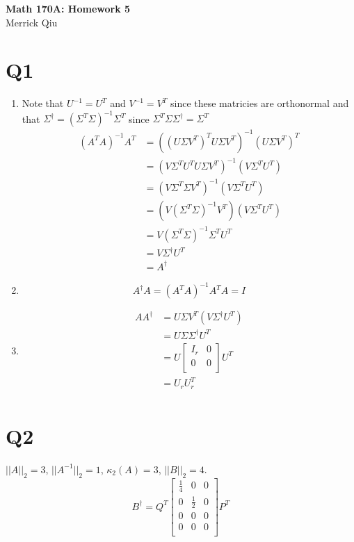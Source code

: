 \documentclass{article}
\newcommand{\inv}[1]{#1^{-1}}
\begin{document}
\begin{center}
	\huge{\bf Math 170A: Homework 5} \\
	Merrick Qiu
\end{center}

\section*{Q1}
\begin{enumerate}
    \item Note that $\inv{U} = U^T$ and $\inv{V} = V^T$
    since these matricies are orthonormal and that 
    $\Sigma^\dagger = \inv{(\Sigma^T \Sigma)}\Sigma^T$
    since $\Sigma^T \Sigma \Sigma^\dagger = \Sigma^T$
    \begin{align*}
        \inv{(A^TA)}A^T &= \inv{((U\Sigma V^T)^TU\Sigma V^T)} (U\Sigma V^T)^T \\
        &= \inv{(V\Sigma^T U^T  U\Sigma V^T)}(V\Sigma^T U^T) \\
        &= \inv{(V\Sigma^T \Sigma V^T)}(V\Sigma^T U^T) \\
        &= (V\inv{(\Sigma^T \Sigma)} V^T)(V\Sigma^T U^T) \\
        &= V\inv{(\Sigma^T \Sigma)}\Sigma^T U^T \\
        &= V \Sigma^\dagger U^T \\
        &= A^\dagger
    \end{align*}
    \item 
    \[
        A^\dagger A = \inv{(A^TA)}A^TA = I 
    \]
    \item \begin{align*}
        A A^\dagger &=  U\Sigma V^T (V\Sigma^\dagger U^T) \\
        &= U \Sigma \Sigma^\dagger U^T \\
        &= U \begin{bmatrix} I_r & 0 \\ 0 & 0 \\\end{bmatrix} U^T \\
        &= U_r U_r^T \\
    \end{align*}
\end{enumerate}

\section*{Q2}
$||A||_2 = 3$, $||\inv{A}||_2 = 1$, $\kappa_2(A)= 3$, 
$||B||_2 = 4$.
 \[
    B^\dagger = Q^T 
    \begin{bmatrix}
        \frac{1}{4} & 0 & 0 \\
        0 & \frac{1}{2} & 0 \\
        0 & 0 & 0 \\
        0 & 0 & 0 \\
    \end{bmatrix}P^T
 \]
 \newpage 
\end{document}
